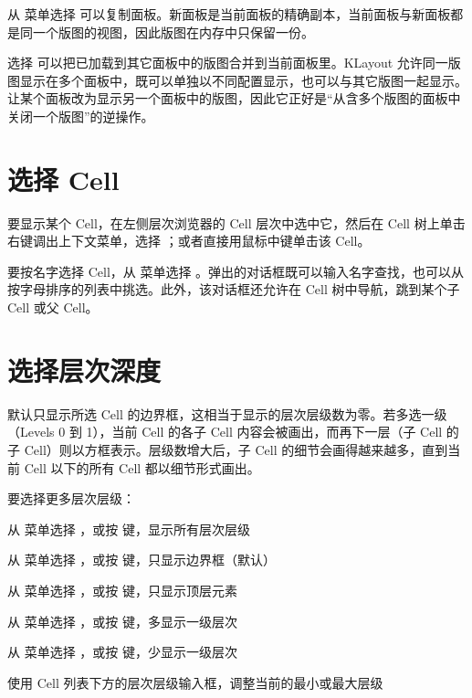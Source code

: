 从  菜单选择  可以复制面板。新面板是当前面板的精确副本，当前面板与新面板都是同一个版图的视图，因此版图在内存中只保留一份。

选择  可以把已加载到其它面板中的版图合并到当前面板里。KLayout 允许同一版图显示在多个面板中，既可以单独以不同配置显示，也可以与其它版图一起显示。 让某个面板改为显示另一个面板中的版图，因此它正好是“从含多个版图的面板中关闭一个版图”的逆操作。

\section{选择 Cell}\label{sec:cell}

要显示某个 Cell，在左侧层次浏览器的 Cell 层次中选中它，然后在 Cell 树上单击右键调出上下文菜单，选择 ；或者直接用鼠标中键单击该 Cell。

要按名字选择 Cell，从  菜单选择 。弹出的对话框既可以输入名字查找，也可以从按字母排序的列表中挑选。此外，该对话框还允许在 Cell 树中导航，跳到某个子 Cell 或父 Cell。

\section{选择层次深度}\label{sec:hier}

默认只显示所选 Cell 的边界框，这相当于显示的层次层级数为零。若多选一级（Levels 0 到 1），当前 Cell 的各子 Cell 内容会被画出，而再下一层（子 Cell 的子 Cell）则以方框表示。层级数增大后，子 Cell 的细节会画得越来越多，直到当前 Cell 以下的所有 Cell 都以细节形式画出。

要选择更多层次层级：

\begin{kldesc}
\item 从  菜单选择 ，或按 \kbd{*} 键，显示所有层次层级
\item 从  菜单选择 ，或按  键，只显示边界框（默认）
\item 从  菜单选择 ，或按  键，只显示顶层元素
\item 从  菜单选择 ，或按 \kbd{+} 键，多显示一级层次
\item 从  菜单选择 ，或按 \kbd{-} 键，少显示一级层次
\item 使用 Cell 列表下方的层次层级输入框，调整当前的最小或最大层级
\end{kldesc}

